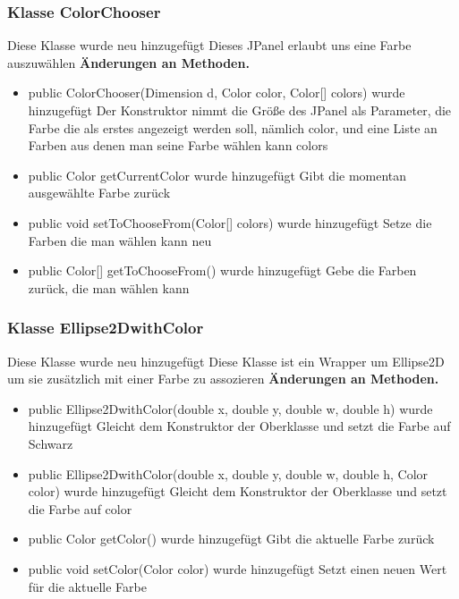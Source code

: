 \documentclass{article}
\begin{document}
	\subsubsection{Klasse ColorChooser}
    Diese Klasse wurde neu hinzugefügt
    Dieses JPanel erlaubt uns eine Farbe auszuwählen
    \textbf{Änderungen an Methoden.}\newline
	   \begin{itemize}
           \item public ColorChooser(Dimension d, Color color, Color[] colors) wurde hinzugefügt\newline
               Der Konstruktor nimmt die Größe des JPanel als Parameter,
               die Farbe die als erstes angezeigt werden soll, nämlich color,
               und eine Liste an Farben aus denen man seine Farbe wählen kann colors
           \item public Color getCurrentColor wurde hinzugefügt\newline
               Gibt die momentan ausgewählte Farbe zurück
           \item public void setToChooseFrom(Color[] colors) wurde hinzugefügt\newline
               Setze die Farben die man wählen kann neu
           \item public Color[] getToChooseFrom() wurde hinzugefügt\newline
               Gebe die Farben zurück, die man wählen kann
           \end{itemize}

	\subsubsection{Klasse Ellipse2DwithColor}
    Diese Klasse wurde neu hinzugefügt
    Diese Klasse ist ein Wrapper um Ellipse2D um
    sie zusätzlich mit einer Farbe zu assozieren
    \textbf{Änderungen an Methoden.}\newline
	   \begin{itemize}
           \item public Ellipse2DwithColor(double x, double y, double w, double h) wurde hinzugefügt\newline
               Gleicht dem Konstruktor der Oberklasse und setzt die Farbe auf Schwarz
           \item public Ellipse2DwithColor(double x, double y, double w, double h, Color color) wurde hinzugefügt\newline
               Gleicht dem Konstruktor der Oberklasse und setzt die Farbe auf color
           \item public Color getColor() wurde hinzugefügt\newline
               Gibt die aktuelle Farbe zurück
           \item public void setColor(Color color) wurde hinzugefügt\newline
               Setzt einen neuen Wert für die aktuelle Farbe
           \end{itemize}
\end{document}
